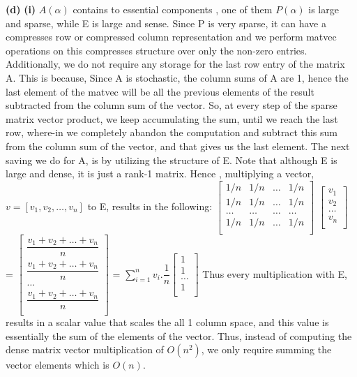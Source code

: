 \documentclass{article}
\renewcommand\part[1]{\vspace{.10in}\textbf{(#1)}}
\begin{document}
  \part{d}
  \textbf {(i)} $A(\alpha)$ contains to essential components , one of them $P(\alpha)$ is large and sparse, while E is large and sense. Since P is very sparse, it can have a compresses row or compressed column representation and we perform matvec operations on this compresses structure over only the non-zero entries. Additionally, we do not require any storage for the last row entry of the matrix A. This is because, Since A is stochastic, the column sums of A are 1, hence the last element of the matvec  will be all the previous elements of the result subtracted from the column sum of the vector. So, at every step of the sparse matrix vector product, we keep accumulating the sum, until we reach the last row, where-in we completely abandon the computation and subtract this sum from the column sum of the vector, and that gives us the last element. \newline
The next saving we do for A, is by utilizing the structure of E. Note that although E is large and dense, it is just a rank-1 matrix. Hence , multiplying a vector, $v = [v_1, v_2, \dots, v_n]$ to E, results in the following: \newline
$\begin{bmatrix}
	1/n & 1/n & \dots & 1/n \\
	1/n & 1/n & \dots & 1/n \\
	\dots & \dots & \dots & \dots \\
	1/n & 1/n & \dots & 1/n \\
\end{bmatrix}$ $\begin{bmatrix}
	v_1 \\
	v_2 \\
	\dots \\
	v_n \\
\end{bmatrix}$ = $\begin{bmatrix} 
	\dfrac{v_1 + v_2 + \dots + v_n}{n} \\
	\dfrac{v_1 + v_2 + \dots + v_n}{n} \\
	\dots \\
	\dfrac{v_1 + v_2 + \dots + v_n}{n} \\
\end{bmatrix}$ = $\sum_{i=1}^n v_i.\dfrac{1}{n} \begin{bmatrix}
	1 \\
	1 \\
	\dots \\
	1 \\
\end{bmatrix}$ \newline
Thus every multiplication with E, results in a scalar value that scales the all 1 column space, and this value is essentially the sum of the elements of the vector. Thus, instead of computing the dense matrix vector multiplication of $O(n^2)$, we only require summing the vector elements which is $O(n)$. \newline
\end{document}
